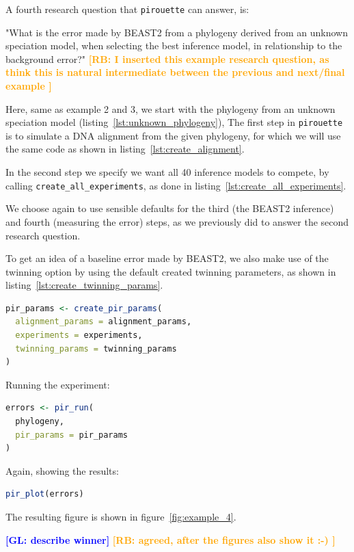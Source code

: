 \documentclass{article}
\newcommand{\giovanni}[1]{\textcolor{blue}{\textbf{[GL: #1]}}}
\newcommand{\richel}[1]{\textcolor{orange}{\textbf{[RB: #1]}}}
\begin{document}
A fourth research question that \verb;pirouette; can answer, is:

"What is the error made by BEAST2 from a phylogeny 
derived from an unknown speciation model,
when selecting the best inference model, 
in relationship to the background error?"
\richel{
  I inserted this example research question, 
  as think this is natural intermediate between the 
  previous and next/final example
}

Here, same as example 2 and 3, we start with the phylogeny 
from an unknown speciation model (listing~\ref{lst:unknown_phylogeny}), 
The first step in \verb;pirouette; is to simulate a DNA alignment 
from the given phylogeny, for which we will use the same code 
as shown in listing~\ref{lst:create_alignment}.

In the second step we specify we want all 
40 inference models to compete, by 
calling \verb;create_all_experiments;,
as done in listing~\ref{lst:create_all_experiments}.

We choose again to use sensible defaults for the third (the BEAST2 inference) 
and fourth (measuring the error) steps, 
as we previously did to answer the second research question. 

To get an idea of a baseline error made by BEAST2, 
we also make use of the twinning option by using the
default created twinning parameters, as shown in 
listing~\ref{lst:create_twinning_params}.

\begin{lstlisting}[language=R, floatplacement=ht, frame=single]
pir_params <- create_pir_params(
  alignment_params = alignment_params,
  experiments = experiments,
  twinning_params = twinning_params
)
\end{lstlisting}

Running the experiment:

\begin{lstlisting}[language=R, floatplacement=ht, frame=single]
errors <- pir_run(
  phylogeny,
  pir_params = pir_params
)
\end{lstlisting}

Again, showing the results:

\begin{lstlisting}[language=R, floatplacement=ht, frame=single]
pir_plot(errors)
\end{lstlisting}

The resulting figure is shown in figure~\ref{fig:example_4}.

\giovanni{describe winner}
\richel{agreed, after the figures also show it :-) }
\end{document}
